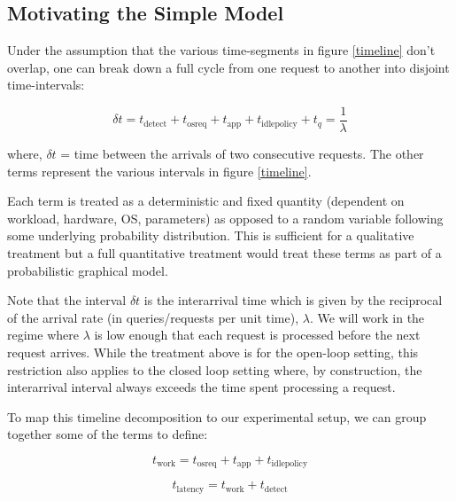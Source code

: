 \label{sec:model}


\subsection{Motivating the Simple Model}

Under the assumption that the various time-segments in figure \ref{timeline} don't overlap, one can break down a full cycle from one request to another into disjoint time-intervals:

\begin{equation}
\delta t = t_{\text{detect}} + t_{\text{osreq}} + t_{\text{app}} + t_{\text{idlepolicy}} + t_q = \frac{1}{\lambda}
\label{eq:time}
\end{equation}

where, $\delta t$ = time between the arrivals of two consecutive requests. The other terms represent the various intervals in figure \ref{timeline}.

Each term is treated as a deterministic and fixed quantity (dependent on workload, hardware, OS, parameters) as opposed to a random variable following some underlying probability distribution. This is sufficient for a qualitative treatment but a full quantitative treatment would treat these terms as part of a probabilistic graphical model.

Note that the interval $\delta t$ is the interarrival time which is given by the reciprocal of the arrival rate (in queries/requests per unit time), $\lambda$. We will work in the regime where $\lambda$ is low enough that each request is processed before the next request arrives. While the treatment above is for the open-loop setting, this restriction also applies to the closed loop setting where, by construction, the interarrival interval always exceeds the time spent processing a request.

To map this timeline decomposition to our experimental setup, we can group together some of the terms to define:

$$t_{\text{work}} = t_{\text{osreq}} + t_{\text{app}} + t_{\text{idlepolicy}}$$

$$t_{\text{latency}} = t_{\text{work}} + t_{\text{detect}}$$

